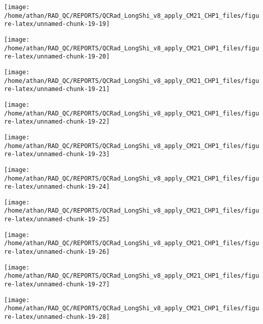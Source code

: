 \documentclass[
  10pt,
  a4paper,oneside]{article}
\begin{document}
\begin{center}\texttt{[image: /home/athan/RAD\_QC/REPORTS/QCRad\_LongShi\_v8\_apply\_CM21\_CHP1\_files/figure-latex/unnamed-chunk-19-19]} \end{center}

\begin{center}\texttt{[image: /home/athan/RAD\_QC/REPORTS/QCRad\_LongShi\_v8\_apply\_CM21\_CHP1\_files/figure-latex/unnamed-chunk-19-20]} \end{center}

\begin{center}\texttt{[image: /home/athan/RAD\_QC/REPORTS/QCRad\_LongShi\_v8\_apply\_CM21\_CHP1\_files/figure-latex/unnamed-chunk-19-21]} \end{center}

\begin{center}\texttt{[image: /home/athan/RAD\_QC/REPORTS/QCRad\_LongShi\_v8\_apply\_CM21\_CHP1\_files/figure-latex/unnamed-chunk-19-22]} \end{center}

\begin{center}\texttt{[image: /home/athan/RAD\_QC/REPORTS/QCRad\_LongShi\_v8\_apply\_CM21\_CHP1\_files/figure-latex/unnamed-chunk-19-23]} \end{center}

\begin{center}\texttt{[image: /home/athan/RAD\_QC/REPORTS/QCRad\_LongShi\_v8\_apply\_CM21\_CHP1\_files/figure-latex/unnamed-chunk-19-24]} \end{center}

\begin{center}\texttt{[image: /home/athan/RAD\_QC/REPORTS/QCRad\_LongShi\_v8\_apply\_CM21\_CHP1\_files/figure-latex/unnamed-chunk-19-25]} \end{center}

\begin{center}\texttt{[image: /home/athan/RAD\_QC/REPORTS/QCRad\_LongShi\_v8\_apply\_CM21\_CHP1\_files/figure-latex/unnamed-chunk-19-26]} \end{center}

\begin{center}\texttt{[image: /home/athan/RAD\_QC/REPORTS/QCRad\_LongShi\_v8\_apply\_CM21\_CHP1\_files/figure-latex/unnamed-chunk-19-27]} \end{center}

\begin{center}\texttt{[image: /home/athan/RAD\_QC/REPORTS/QCRad\_LongShi\_v8\_apply\_CM21\_CHP1\_files/figure-latex/unnamed-chunk-19-28]} \end{center}
\end{document}
